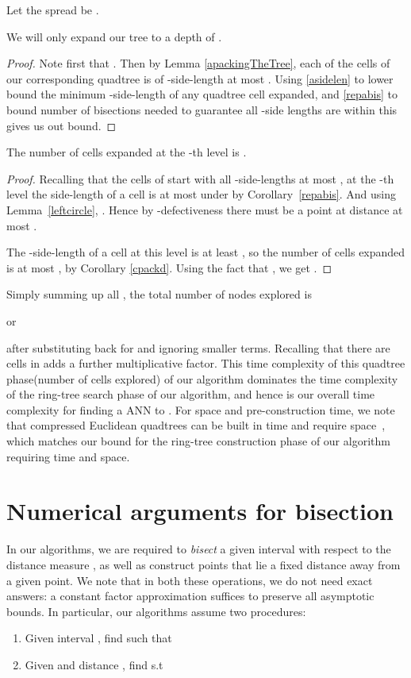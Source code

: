 \documentclass[11pt]{myclass}
\begin{document}
Let the spread be .
\begin{lemma}\label{AfinalTreeDepth}
We will only expand our tree to a depth of 
.
\end{lemma}

\begin{proof}
 Note first that . Then 
by Lemma \ref{apackingTheTree}, each of the cells of our corresponding quadtree is of -side-length at most
.  Using \ref{asidelen} to lower bound the minimum -side-length of any quadtree cell expanded, and \ref{repabis} to bound number of bisections needed to guarantee all -side lengths are within this  gives us out bound.
\end{proof}


\begin{lemma}\label{atreebreadth}
 The number of cells expanded at the -th level is 
.
\end{lemma}
 
\begin{proof}
Recalling that the cells of  start with all -side-lengths at most ,
at the -th level the side-length of a cell  is at most  under  by Corollary~\ref{repabis}. 
And using Lemma~\ref{leftcircle},  .
Hence by -defectiveness there must be a point at distance at most 
.

The -side-length of a cell  at this level is at least , so the number of cells expanded is at most , 
by Corollary \ref{cpackd}.
Using the fact that , we get 
.
\end{proof}

Simply summing up all , the total number of nodes explored is

or

after substituting back for  and ignoring smaller terms.
Recalling that there are  cells in  adds a further  multiplicative factor.
This time complexity of this quadtree phase(number of cells explored) of our algorithm dominates the time complexity of the ring-tree 
search phase of our algorithm, and hence is our overall time
complexity for finding a  ANN to .
For space and pre-construction time, we note that compressed Euclidean quadtrees can be built in  time and require  space~\cite{snotes},
which matches our bound for the ring-tree construction phase of our algorithm requiring  time and  space. 

\section{Numerical arguments for bisection}\label{sec:numerical}
In our algorithms, we are required to \emph{bisect} a given interval with respect to the distance measure , as well as construct points that lie a fixed distance away from a given point. We note that in both these operations, we do not need exact answers: a constant factor approximation suffices to preserve all asymptotic bounds.  
In particular, our algorithms assume two procedures: 
\begin{enumerate}
\item{Given interval , find  such that }

\item{ Given  and distance , find  s.t } 
\end{enumerate}
\end{document}
